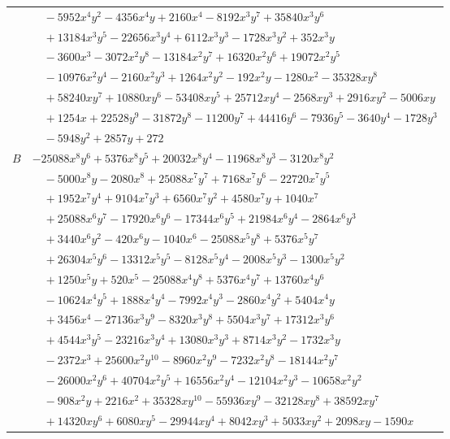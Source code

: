 \documentclass[11pt]{article}
\begin{document}
\begin{longtable}{@{}ll@{}}
 & $\quad -5952x^{4}y^{2}-4356x^{4}y+2160x^{4}-8192x^{3}y^{7}+35840x^{3}y^{6}$\\
 & $\quad +13184x^{3}y^{5}-22656x^{3}y^{4}+6112x^{3}y^{3}-1728x^{3}y^{2}+352x^{3}y$\\
 & $\quad -3600x^{3}-3072x^{2}y^{8}-13184x^{2}y^{7}+16320x^{2}y^{6}+19072x^{2}y^{5}$\\
 & $\quad -10976x^{2}y^{4}-2160x^{2}y^{3}+1264x^{2}y^{2}-192x^{2}y-1280x^{2}-35328xy^{8}$\\
 & $\quad +58240xy^{7}+10880xy^{6}-53408xy^{5}+25712xy^{4}-2568xy^{3}+2916xy^{2}-5006xy$\\
 & $\quad +1254x+22528y^{9}-31872y^{8}-11200y^{7}+44416y^{6}-7936y^{5}-3640y^{4}-1728y^{3}$\\
 & $\quad -5948y^{2}+2857y+272$\\
$B$ & $-25088x^{8}y^{6}+5376x^{8}y^{5}+20032x^{8}y^{4}-11968x^{8}y^{3}-3120x^{8}y^{2}$\\
 & $\quad -5000x^{8}y-2080x^{8}+25088x^{7}y^{7}+7168x^{7}y^{6}-22720x^{7}y^{5}$\\
 & $\quad +1952x^{7}y^{4}+9104x^{7}y^{3}+6560x^{7}y^{2}+4580x^{7}y+1040x^{7}$\\
 & $\quad +25088x^{6}y^{7}-17920x^{6}y^{6}-17344x^{6}y^{5}+21984x^{6}y^{4}-2864x^{6}y^{3}$\\
 & $\quad +3440x^{6}y^{2}-420x^{6}y-1040x^{6}-25088x^{5}y^{8}+5376x^{5}y^{7}$\\
 & $\quad +26304x^{5}y^{6}-13312x^{5}y^{5}-8128x^{5}y^{4}-2008x^{5}y^{3}-1300x^{5}y^{2}$\\
 & $\quad +1250x^{5}y+520x^{5}-25088x^{4}y^{8}+5376x^{4}y^{7}+13760x^{4}y^{6}$\\
 & $\quad -10624x^{4}y^{5}+1888x^{4}y^{4}-7992x^{4}y^{3}-2860x^{4}y^{2}+5404x^{4}y$\\
 & $\quad +3456x^{4}-27136x^{3}y^{9}-8320x^{3}y^{8}+5504x^{3}y^{7}+17312x^{3}y^{6}$\\
 & $\quad +4544x^{3}y^{5}-23216x^{3}y^{4}+13080x^{3}y^{3}+8714x^{3}y^{2}-1732x^{3}y$\\
 & $\quad -2372x^{3}+25600x^{2}y^{10}-8960x^{2}y^{9}-7232x^{2}y^{8}-18144x^{2}y^{7}$\\
 & $\quad -26000x^{2}y^{6}+40704x^{2}y^{5}+16556x^{2}y^{4}-12104x^{2}y^{3}-10658x^{2}y^{2}$\\
 & $\quad -908x^{2}y+2216x^{2}+35328xy^{10}-55936xy^{9}-32128xy^{8}+38592xy^{7}$\\
 & $\quad +14320xy^{6}+6080xy^{5}-29944xy^{4}+8042xy^{3}+5033xy^{2}+2098xy-1590x$\\

\end{longtable}
\end{document}
